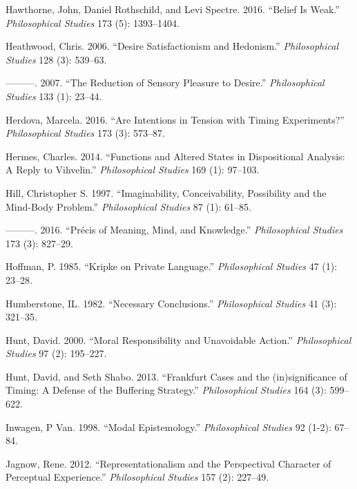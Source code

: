 \documentclass[
  10pt,
  letterpaper,
  DIV=11,
  numbers=noendperiod,
  twoside]{scrartcl}
\newlength{\cslhangindent}
\newenvironment{CSLReferences}[2] %
 {\begin{list}{}{%
  \setlength{\itemindent}{0pt}
  \setlength{\leftmargin}{0pt}
  \setlength{\parsep}{0pt}
  \ifodd #1
   \setlength{\leftmargin}{\cslhangindent}
   \setlength{\itemindent}{-1\cslhangindent}
  \fi
  \setlength{\itemsep}{#2\baselineskip}}}
 {\end{list}}
\begin{document}
\begin{CSLReferences}{1}{0}
Hawthorne, John, Daniel Rothschild, and Levi Spectre. 2016. {``Belief Is
Weak.''} \emph{Philosophical Studies} 173 (5): 1393--1404.

Heathwood, Chris. 2006. {``Desire Satisfactionism and Hedonism.''}
\emph{Philosophical Studies} 128 (3): 539--63.

---------. 2007. {``The Reduction of Sensory Pleasure to Desire.''}
\emph{Philosophical Studies} 133 (1): 23--44.

Herdova, Marcela. 2016. {``Are Intentions in Tension with Timing
Experiments?''} \emph{Philosophical Studies} 173 (3): 573--87.

Hermes, Charles. 2014. {``Functions and Altered States in Dispositional
Analysis: A Reply to Vihvelin.''} \emph{Philosophical Studies} 169 (1):
97--103.

Hill, Christopher S. 1997. {``Imaginability, Conceivability, Possibility
and the Mind-Body Problem.''} \emph{Philosophical Studies} 87 (1):
61--85.

---------. 2016. {``Précis of Meaning, Mind, and Knowledge.''}
\emph{Philosophical Studies} 173 (3): 827--29.

Hoffman, P. 1985. {``Kripke on Private Language.''} \emph{Philosophical
Studies} 47 (1): 23--28.

Humberstone, IL. 1982. {``Necessary Conclusions.''} \emph{Philosophical
Studies} 41 (3): 321--35.

Hunt, David. 2000. {``Moral Responsibility and Unavoidable Action.''}
\emph{Philosophical Studies} 97 (2): 195--227.

Hunt, David, and Seth Shabo. 2013. {``Frankfurt Cases and the
(in)significance of Timing: A Defense of the Buffering Strategy.''}
\emph{Philosophical Studies} 164 (3): 599--622.

Inwagen, P Van. 1998. {``Modal Epistemology.''} \emph{Philosophical
Studies} 92 (1-2): 67--84.

Jagnow, Rene. 2012. {``Representationalism and the Perspectival
Character of Perceptual Experience.''} \emph{Philosophical Studies} 157
(2): 227--49.


\end{CSLReferences}
\end{document}
